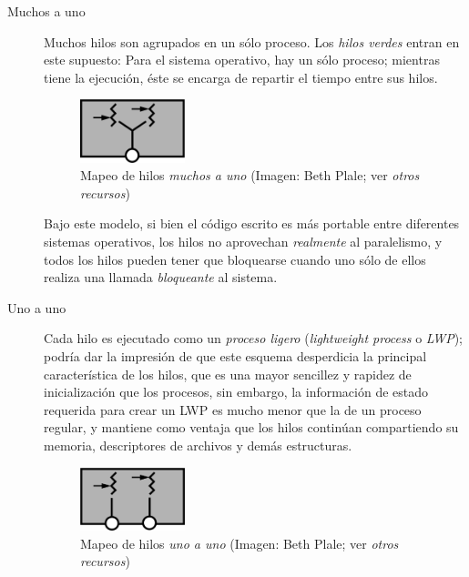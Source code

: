 \documentclass[11pt,fleqn]{book} %
\begin{document}
\begin{description}
\item[Muchos a uno] Muchos hilos son agrupados en un sólo proceso. Los
                  \emph{hilos verdes} entran en este supuesto: Para el
                  sistema operativo, hay un sólo proceso; mientras
                  tiene la ejecución, éste se encarga de repartir el
                  tiempo entre sus hilos.

		  \begin{figure}[htb]
		  \centering
		  \includegraphics[width=0.3\textwidth]{./img/hilos_muchos_a_uno.png}
		  \caption{\label{PLAN_hilos_muchos_a_uno}Mapeo de hilos \emph{muchos a uno} (Imagen: Beth Plale; ver \emph{otros recursos})}
		  \end{figure}

		  Bajo este modelo, si bien el código escrito es más
                  portable entre diferentes sistemas operativos, los
                  hilos no aprovechan \emph{realmente} al paralelismo, y
                  todos los hilos pueden tener que bloquearse cuando
                  uno sólo de ellos realiza una llamada \emph{bloqueante}
                  al sistema.
\item[Uno a uno] Cada hilo es ejecutado como un \emph{proceso ligero}
               (\emph{lightweight process} o \emph{LWP}); podría dar la
               impresión de que este esquema desperdicia la principal
               característica de los hilos, que es una mayor sencillez
               y rapidez de inicialización que los procesos, sin
               embargo, la información de estado requerida para crear
               un LWP es mucho menor que la de un proceso regular, y
               mantiene como ventaja que los hilos continúan
               compartiendo su memoria, descriptores de archivos y
               demás estructuras.

	       \begin{figure}[htb]
	       \centering
	       \includegraphics[width=0.3\textwidth]{./img/hilos_uno_a_uno.png}
	       \caption{\label{PLAN_hilos_uno_a_uno}Mapeo de hilos \emph{uno a uno} (Imagen: Beth Plale; ver \emph{otros recursos})}
	       \end{figure}


\end{description}
\end{document}
